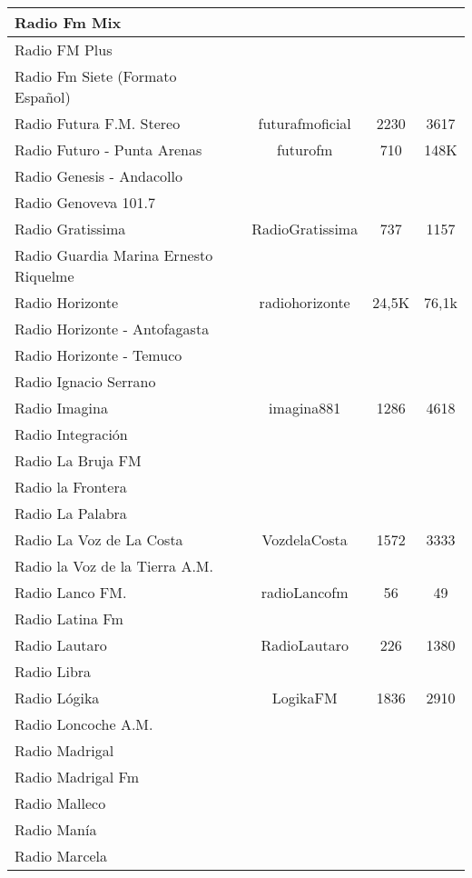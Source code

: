 \begin{center}
\begin{longtable}{| l | c | c | c |}
Radio Fm Mix	&		&		&		\\ \hline
Radio FM Plus	&		&		&		\\ \hline
Radio Fm Siete (Formato Español)	&		&		&		\\ \hline
Radio Futura F.M. Stereo	&	futurafmoficial	&	2230	&	3617	\\ \hline
Radio Futuro - Punta Arenas	&	futurofm	&	710	&	148K	\\ \hline
Radio Genesis - Andacollo	&		&		&		\\ \hline
Radio Genoveva 101.7	&		&		&		\\ \hline
Radio Gratissima	&	RadioGratissima	&	737	&	1157	\\ \hline
Radio Guardia Marina Ernesto Riquelme	&		&		&		\\ \hline
Radio Horizonte	&	radiohorizonte	&	24,5K	&	76,1k	\\ \hline
Radio Horizonte - Antofagasta	&		&		&		\\ \hline
Radio Horizonte - Temuco	&		&		&		\\ \hline
Radio Ignacio Serrano	&		&		&		\\ \hline
Radio Imagina	&	imagina881	&	1286	&	4618	\\ \hline
Radio Integración	&		&		&		\\ \hline
Radio La Bruja FM	&		&		&		\\ \hline
Radio la Frontera	&		&		&		\\ \hline
Radio La Palabra	&		&		&		\\ \hline
Radio La Voz de La Costa	&	VozdelaCosta	&	1572	&	3333	\\ \hline
Radio la Voz de la Tierra A.M.	&		&		&		\\ \hline
Radio Lanco FM.	&	radioLancofm	&	56	&	49	\\ \hline
Radio Latina Fm	&		&		&		\\ \hline
Radio Lautaro	&	RadioLautaro	&	226	&	1380	\\ \hline
Radio Libra	&		&		&		\\ \hline
Radio Lógika	&	LogikaFM	&	1836	&	2910	\\ \hline
Radio Loncoche A.M.	&		&		&		\\ \hline
Radio Madrigal	&		&		&		\\ \hline
Radio Madrigal Fm	&		&		&		\\ \hline
Radio Malleco	&		&		&		\\ \hline
Radio Manía	&		&		&		\\ \hline
Radio Marcela	&		&		&		\\ \hline

\end{longtable}
\end{center}
